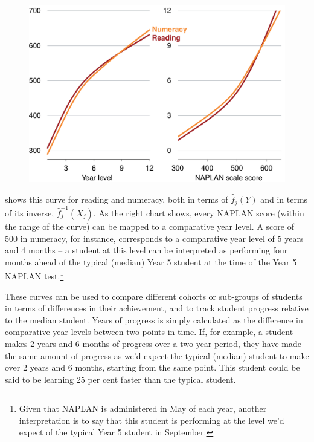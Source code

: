 \begin{figure}[t]
 \includegraphics[width=\columnwidth]{atlas/CYL_and_inverse.pdf}\label{fig:cyl_inverse}

\end{figure}

 shows this curve for reading and numeracy, both in terms of $\widehat{f}_{j}(Y)$ and in terms of its inverse, $\widehat{f}_{j}^{-1}(X_{j})$. As the right chart shows, every NAPLAN score (within the range of the curve) can be mapped to a comparative year level. A score of 500 in numeracy, for instance, corresponds to a comparative year level of 5 years and 4 months -- a student at this level can be interpreted as performing four months ahead of the typical (median) Year 5 student at the time of the Year 5 NAPLAN test.\footnote{Given that NAPLAN is administered in May of each year, another interpretation is to say that this student is performing at the level we'd expect of the typical Year 5 student in September.}

These curves can be used to compare different cohorts or sub-groups of students in terms of differences in their achievement, and to track student progress relative to the median student. Years of progress is simply calculated as the difference in comparative year levels between two points in time. If, for example, a student makes 2 years and 6 months of progress over a two-year period, they have made the same amount of progress as we'd expect the typical (median) student to make over 2 years and 6 months, starting from the same point. This student could be said to be learning 25 per cent faster than the typical student.

